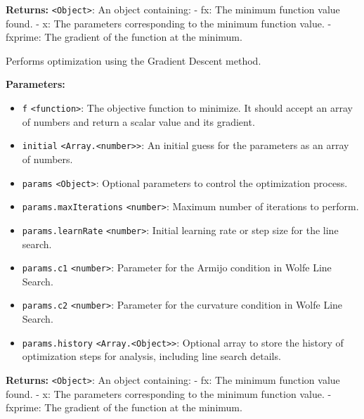 \documentclass[12pt,a4paper]{article}
\begin{document}
\noindent \textbf{Returns:} \texttt{<Object>}: An object containing:
  - \textasciigrave{}fx\textasciigrave{}: The minimum function value found.
  - \textasciigrave{}x\textasciigrave{}: The parameters corresponding to the minimum function value.
  - \textasciigrave{}fxprime\textasciigrave{}: The gradient of the function at the minimum.

\noindent Performs optimization using the Gradient Descent method.

\vspace{5mm}
\noindent {}


\noindent \textbf{Parameters:}
\begin{itemize}
  \item \texttt{f} \texttt{<function>}: The objective function to minimize. It should accept an array of numbers and return a scalar value and its gradient.
  \item \texttt{initial} \texttt{<Array.<number>>}: An initial guess for the parameters as an array of numbers.
  \item \texttt{params} \texttt{<Object>}: Optional parameters to control the optimization process.
  \item \texttt{params.maxIterations} \texttt{<number>}: Maximum number of iterations to perform.
  \item \texttt{params.learnRate} \texttt{<number>}: Initial learning rate or step size for the line search.
  \item \texttt{params.c1} \texttt{<number>}: Parameter for the Armijo condition in Wolfe Line Search.
  \item \texttt{params.c2} \texttt{<number>}: Parameter for the curvature condition in Wolfe Line Search.
  \item \texttt{params.history} \texttt{<Array.<Object>>}: Optional array to store the history of optimization steps for analysis, including line search details.
\end{itemize}

\noindent \textbf{Returns:} \texttt{<Object>}: An object containing:
  - \textasciigrave{}fx\textasciigrave{}: The minimum function value found.
  - \textasciigrave{}x\textasciigrave{}: The parameters corresponding to the minimum function value.
  - \textasciigrave{}fxprime\textasciigrave{}: The gradient of the function at the minimum.
\end{document}
